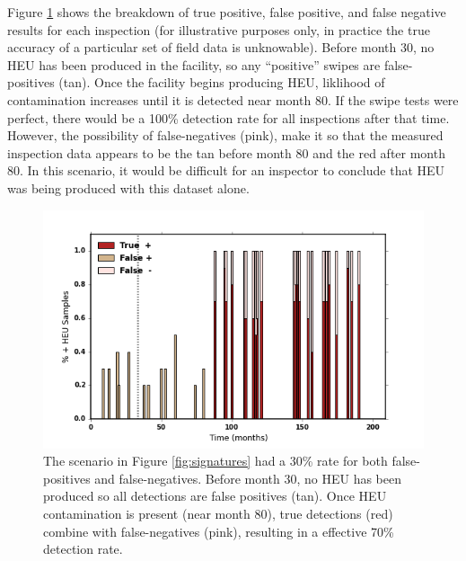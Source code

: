 Figure \ref{fig:false_inspect} shows the breakdown of true positive, false positive, and false negative results for each inspection (for illustrative purposes only, in practice the true accuracy of a particular set of field data is unknowable).  Before month 30, no \gls{HEU} has been produced in the facility, so any ``positive'' swipes are false-positives (tan). Once the facility begins producing \gls{HEU}, liklihood of contamination increases until it is detected near month 80. If the swipe tests were perfect, there would be a 100\% detection rate for all inspections after that time. However, the possibility of false-negatives (pink), make it so that the measured inspection data appears to be the tan before month 80 and the red after month 80.  In this scenario, it would be difficult for an inspector to conclude that \gls{HEU} was being produced with this dataset alone.

\begin{figure}%
\begin{center}
\includegraphics[natwidth=162bp,natheight=227bp, scale=0.6]{./figs/mm_5enrich_tinytails_inspswipe_rates.png}
\end{center}
\caption{The scenario in Figure \ref{fig:signatures} had a 30\% rate for both false-positives and false-negatives. Before month 30, no HEU has been produced so all detections are false positives (tan). Once \gls{HEU} contamination is present (near month 80), true detections (red) combine with false-negatives (pink), resulting in a effective 70\% detection rate.}
\label{fig:false_inspect}
\end{figure}
